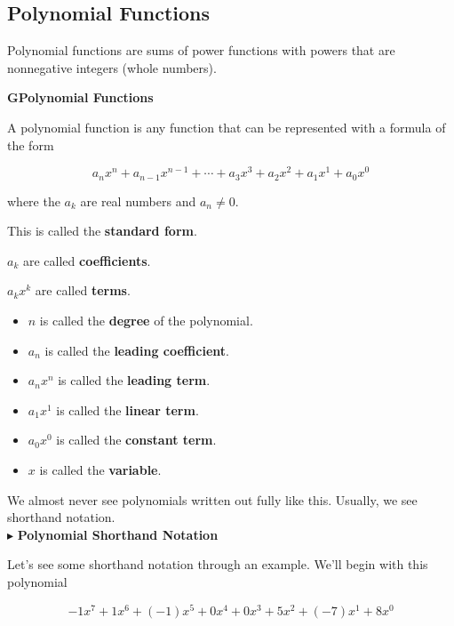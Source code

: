 \documentclass{ximera}
\begin{document}
\subsection{Polynomial Functions}


Polynomial functions are sums of power functions with powers that are nonnegative integers (whole numbers).


\begin{definition} \textbf{\textcolor{green!50!black}{GPolynomial Functions}} 

A polynomial function is any function that can be represented with a formula of the form

\[    a_n x^n + a_{n-1} x^{n-1} + \cdots + a_3 x^3 + a_2 x^2 + a_1 x^1 + a_0 x^0      \]

where the $a_k$ are real numbers and $a_n \ne 0$.

This is called the \textbf{standard form}.

$a_k$ are called \textbf{coefficients}.

$a_k x^k$ are called \textbf{terms}.



\begin{itemize}
\item $n$ is called the \textbf{degree} of the polynomial.
\item $a_n$ is called the \textbf{leading coefficient}.
\item $a_n x^n$ is called the \textbf{leading term}.
\item $a_1 x^1$ is called the \textbf{linear term}.
\item $a_0 x^0$ is called the \textbf{constant term}.
\item $x$ is called the \textbf{variable}.
\end{itemize}


\end{definition}




We almost never see polynomials written out fully like this.  Usually, we see shorthand notation.   \\



$\blacktriangleright$ \textbf{Polynomial Shorthand Notation}


Let's see some shorthand notation through an example.  We'll begin with this polynomial


\[  -1 x^7 + 1 x^6 + (-1) x^5 + 0 x^4 + 0 x^3 + 5 x^2 + (-7) x^1 + 8 x^0              \]
\end{document}
